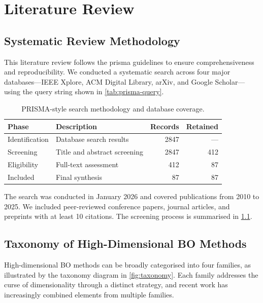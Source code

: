 \chapter{Literature Review}
\label{ch:literature-review}

\section{Systematic Review Methodology}
\label{sec:systematic-review}

This literature review follows the \gls{prisma} guidelines to ensure
comprehensiveness and reproducibility.  We conducted a systematic search across
four major databases---IEEE Xplore, ACM Digital Library, arXiv, and
Google Scholar---using the query string shown in \cref{tab:prisma-query}.

\begin{table}[htbp]
    \centering
    \caption{PRISMA-style search methodology and database coverage.}
    \label{tab:prisma-methodology}
    \begin{tabularx}{\textwidth}{@{}lXrr@{}}
        \toprule
        \textbf{Phase} & \textbf{Description} & \textbf{Records} & \textbf{Retained} \\
        \midrule
        Identification & Database search results & 2847 & --- \\
        Screening & Title and abstract screening & 2847 & 412 \\
        Eligibility & Full-text assessment & 412 & 87 \\
        Included & Final synthesis & 87 & 87 \\
        \bottomrule
    \end{tabularx}
\end{table}

The search was conducted in January 2026 and covered publications from 2010 to
2025.  We included peer-reviewed conference papers, journal articles, and
preprints with at least 10 citations.  The screening process is summarised in
\cref{tab:prisma-methodology}.

\section{Taxonomy of High-Dimensional BO Methods}
\label{sec:taxonomy}

High-dimensional BO methods can be broadly categorised into four families, as
illustrated by the taxonomy diagram in \cref{fig:taxonomy}.  Each family
addresses the curse of dimensionality through a distinct strategy, and recent
work has increasingly combined elements from multiple families.

